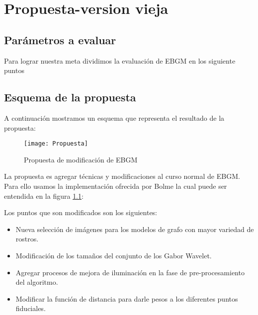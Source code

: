 \chapter{Propuesta-version vieja}



\section{Parámetros a evaluar}
Para lograr nuestra meta dividimos la evaluación de \ac{EBGM} en los siguiente puntos


\section{Esquema de la propuesta}
A continuación mostramos un esquema que representa el resultado de la propuesta:

\begin{figure}
	\texttt{[image: Propuesta]}
    \caption{Propuesta de modificación de \ac{EBGM}}
    \label{Proceso}
\end{figure}
La propuesta es agregar técnicas y modificaciones al curso normal de \ac{EBGM}. Para ello usamos la implementación ofrecida por Bolme \cite{bolme2003elastic} la cual puede ser entendida en la figura \ref{Proceso}:

Los puntos que son modificados son los siguientes: 
\begin{itemize}
\item Nueva selección de imágenes para los modelos de grafo con mayor variedad de rostros.
\item Modificación de los tamaños del conjunto de los Gabor Wavelet.
\item Agregar procesos de mejora de iluminación en la fase de pre-procesamiento del algoritmo.
\item Modificar la función de distancia para darle pesos a los diferentes puntos fiduciales.
\end{itemize}






